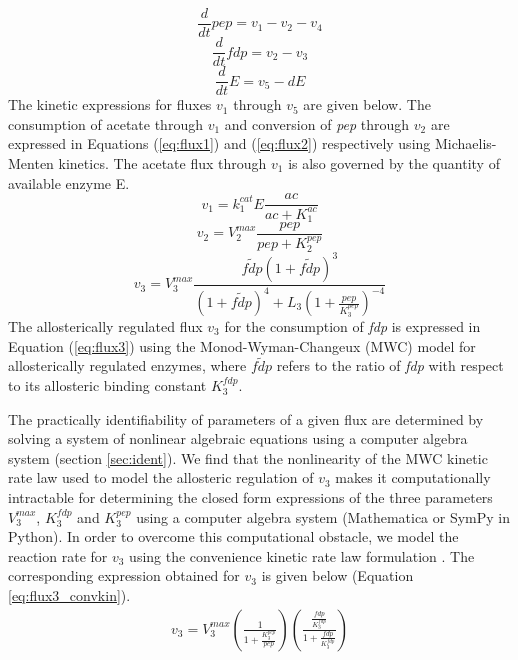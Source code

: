 \documentclass[10pt]{article}
\begin{document}
	\begin{equation}\label{eq:ode1}
	\frac{d}{dt}pep=v_1-v_2-v_4
	\end{equation}
	\begin{equation}\label{eq:ode2}
	\frac{d}{dt}fdp=v_2-v_3
	\end{equation}
	\begin{equation}\label{eq:ode3}
	\frac{d}{dt}E=v_5 - d E
	\end{equation}
	The kinetic expressions for fluxes $v_1$ through $v_5$ are given below. The consumption of acetate through $v_1$ and conversion of \textit{pep} through $v_2$ are expressed in Equations (\ref{eq:flux1}) and (\ref{eq:flux2}) respectively using Michaelis-Menten kinetics. The acetate flux through $v_1$ is also governed by the quantity of available enzyme E. 
	\begin{equation}\label{eq:flux1}
	v_1 = k_{1}^{cat}E\frac{ac}{ac+K_{1}^{ac}}
	\end{equation}	
	\begin{equation}\label{eq:flux2}
	v_2 = V_{2}^{max}\frac{pep}{pep+K_{2}^{pep}}
	\end{equation}
	\begin{equation}\label{eq:flux3}
	v_3 = V_{3}^{max}\frac{\tilde{fdp}\left(1+\tilde{fdp}\right)^3}{\left(1+\tilde{fdp}\right)^4+L_3\left(1+\frac{pep}{K_{3}^{pep}}\right)^{-4}}
	\end{equation}
	The allosterically regulated flux $v_3$ for the consumption of \textit{fdp} is expressed in Equation (\ref{eq:flux3}) using the Monod-Wyman-Changeux (MWC) model for allosterically regulated enzymes, where $\tilde{fdp}$ refers to the ratio of \textit{fdp} with respect to its allosteric binding constant $K_{3}^{fdp}$. 
	
	The practically identifiability of parameters of a given flux are determined by solving a system of nonlinear algebraic equations using a computer algebra system (section \ref{sec:ident}). We find that the nonlinearity of the MWC kinetic rate law used to model the allosteric regulation of $v_3$ makes it computationally intractable for determining the closed form expressions of the three parameters $V_3^{max}$, $K_3^{fdp}$ and $K_3^{pep}$ using a computer algebra system (Mathematica or SymPy in Python). In order to overcome this computational obstacle, we model the reaction rate for $v_3$ using the convenience kinetic rate law formulation \parencite{Liebermeister2006}. The corresponding expression obtained for $v_3$ is given below (Equation \ref{eq:flux3_convkin}). 	
	\begin{align}\label{eq:flux3_convkin}
	v_3 = V_3^{max}\left(\frac{1}{1 + \frac{K_3^{pep}}{pep}}\right)\left(\frac{\frac{fdp}{K_3^{fdp}}}{1 + \frac{fdp}{K_3^{fdp}}}\right)
	\end{align}	
	
\end{document}
